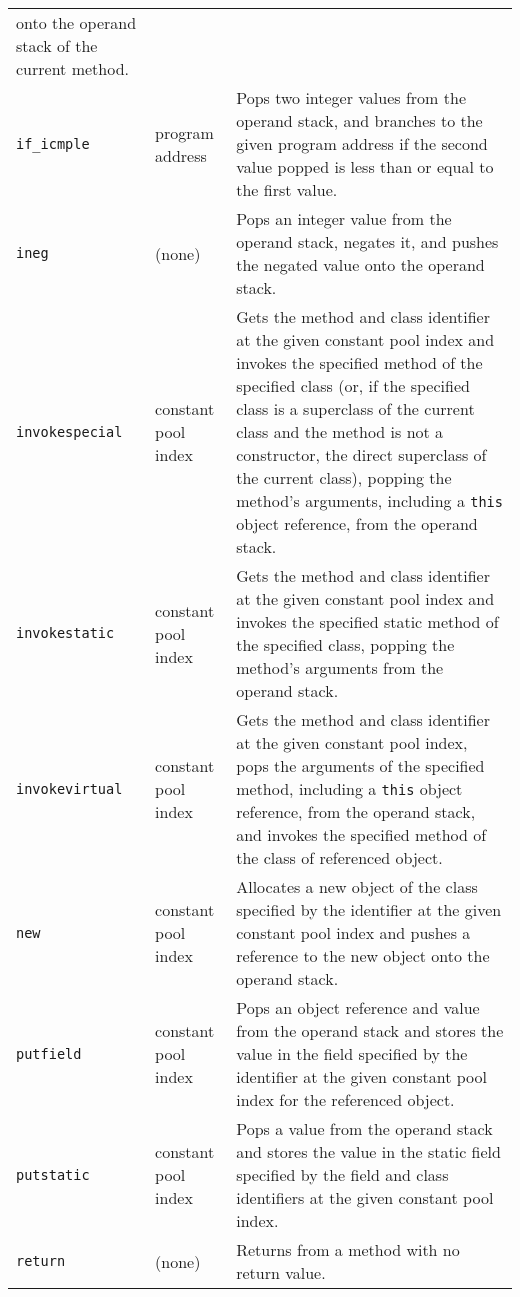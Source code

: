 {\begin{supertabular}{llp{7.5cm}}
    onto the operand stack of the current method.
    \\
    \texttt{if\_icmple} & program address & Pops two integer values
    from the operand stack, and branches to the given program address
    if the second value popped is less than or equal to the first
    value.
    \\
    \texttt{ineg} & (none) & Pops an integer value from the operand
    stack, negates it, and pushes the negated value onto the operand
    stack.
    \\
    \texttt{invokespecial} & constant pool index & Gets the method and
    class identifier at the given constant pool index and invokes the
    specified method of the specified class (or, if the specified
    class is a superclass of the current class and the method is not a
    constructor, the direct superclass of the current class), popping
    the method's arguments, including a \texttt{this} object
    reference, from the operand stack.
    \\
    \texttt{invokestatic} & constant pool index & Gets the method and
    class identifier at the given constant pool index and invokes the
    specified static method of the specified class, popping the
    method's arguments from the operand stack.
    \\
    \texttt{invokevirtual} & constant pool index & Gets the method and
    class identifier at the given constant pool index, pops the
    arguments of the specified method, including a \texttt{this}
    object reference, from the operand stack, and invokes the
    specified method of the class of referenced object.
    \\
    \texttt{new} & constant pool index & Allocates a new object of the
    class specified by the identifier at the given constant pool index
    and pushes a reference to the new object onto the operand stack.
    \\
    \texttt{putfield} & constant pool index & Pops an object reference
    and value from the operand stack and stores the value in the field
    specified by the identifier at the given constant pool index for
    the referenced object.
    \\
    \texttt{putstatic} & constant pool index & Pops a value from the
    operand stack and stores the value in the static field specified
    by the field and class identifiers at the given constant pool
    index.
    \\
    \texttt{return} & (none) & Returns from a method with no return
    value.
    \\
  \end{supertabular}
  \vspace{\textfloatsep}
}

